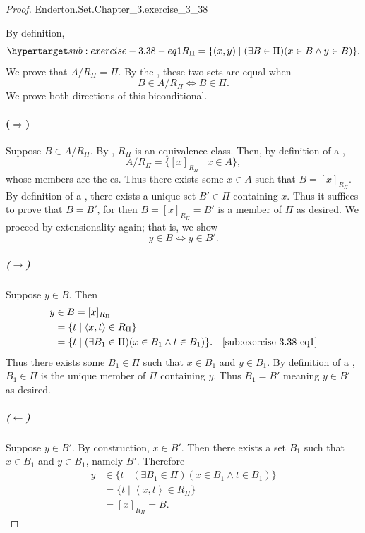 \documentclass{report}
\newcommand{\pair}[1]{\left< #1 \right>}
\begin{document}
\begin{proof}

    {Enderton.Set.Chapter\_3.exercise\_3\_38}

  By definition,
    \begin{equation}
      \hyperlabel{sub:exercise-3.38-eq1}
      R_\Pi = \{ (x, y) \mid (\exists B \in \Pi)(x \in B \land y \in B) \}.
    \end{equation}
  We prove that $A / R_\Pi = \Pi$.
  By the , these two sets are equal when
    $$B \in A / R_\Pi \iff B \in \Pi.$$
  We prove both directions of this biconditional.

  \paragraph{($\Rightarrow$)}%

    Suppose $B \in A / R_\Pi$.
    By , $R_\Pi$ is an equivalence class.
    Then, by definition of a ,
      $$A / R_\Pi = \{[x]_{R_\Pi} \mid x \in A\},$$
      whose members are the es.
    Thus there exists some $x \in A$ such that $B = [x]_{R_\Pi}$.
    By definition of a , there exists a unique set
      $B' \in \Pi$ containing $x$.
    Thus it suffices to prove that $B = B'$, for then $B = [x]_{R_\Pi} = B'$ is
      a member of $\Pi$ as desired.
    We proceed by extensionality again; that is, we show
      $$y \in B \iff y \in B'.$$

    \subparagraph{($\rightarrow$)}%

      Suppose $y \in B$.
      Then
        \begin{align*}
          y
            & \in B = [x]_{R_\Pi} \\
            & = \{t \mid \pair{x, t} \in R_\Pi\} \\
            & = \{t \mid (\exists B_1 \in \Pi)(x \in B_1 \land t \in B_1)\}.
              & \eqref{sub:exercise-3.38-eq1}
        \end{align*}
      Thus there exists some $B_1 \in \Pi$ such that $x \in B_1$ and
        $y \in B_1$.
      By definition of a , $B_1 \in \Pi$ is the unique
        member of $\Pi$ containing $y$.
      Thus $B_1 = B'$ meaning $y \in B'$ as desired.

    \subparagraph{($\leftarrow$)}%

      Suppose $y \in B'$.
      By construction, $x \in B'$.
      Then there exists a set $B_1$ such that $x \in B_1$ and $y \in B_1$,
        namely $B'$.
      Therefore
        \begin{align*}
          y
            & \in \{t \mid (\exists B_1 \in \Pi)(x \in B_1 \land t \in B_1)\} \\
            & = \{t \mid \pair{x, t} \in R_\Pi\} \\
            & = [x]_{R_\Pi} = B.
        \end{align*}


\end{proof}
\end{document}
